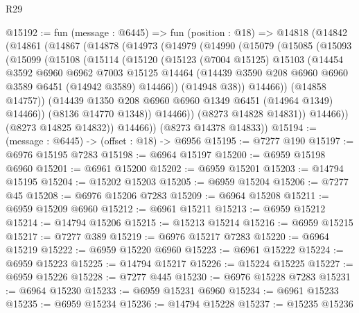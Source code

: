\begin{lexlean}{R29}
\begin{coremodule}
@15192 := fun (message : @6445) =>
  fun (position : @18) =>
  @14818
    (@14842
      (@14861
        (@14867
          (@14878
            (@14973
              (@14979
                (@14990
                  (@15079
                    (@15085
                      (@15093
                        (@15099
                          (@15108
                            (@15114
                              (@15120
                                (@15123
                                  (@7004 @15125)
                                  @15103
                                  (@14454
                                    @3592
                                    @6960
                                    @6962
                                    @7003
                                    @15125
                                    @14464
                                    (@14439
                                      @3590
                                      @208
                                      @6960
                                      @6960
                                      @3589
                                      @6451
                                      (@14942 @3589)
                                      @14466))
                                  (@14948 @38))
                                @14466))
                            (@14858 @14757))
                          (@14439 @1350 @208 @6960 @6960 @1349 @6451 (@14964 @1349) @14466))
                        (@8136 @14770 @1348))
                      @14466))
                  (@8273 @14828 @14831))
                @14466))
            (@8273 @14825 @14832))
          @14466))
      (@8273 @14378 @14833))
@15194 := (message : @6445) -> (offset : @18) -> @6956
@15195 := @7277 @190
@15197 := @6976 @15195 @7283
@15198 := @6964 @15197
@15200 := @6959 @15198 @6960
@15201 := @6961 @15200
@15202 := @6959 @15201
@15203 := @14794 @15195
@15204 := @15202 @15203
@15205 := @6959 @15204
@15206 := @7277 @45
@15208 := @6976 @15206 @7283
@15209 := @6964 @15208
@15211 := @6959 @15209 @6960
@15212 := @6961 @15211
@15213 := @6959 @15212
@15214 := @14794 @15206
@15215 := @15213 @15214
@15216 := @6959 @15215
@15217 := @7277 @389
@15219 := @6976 @15217 @7283
@15220 := @6964 @15219
@15222 := @6959 @15220 @6960
@15223 := @6961 @15222
@15224 := @6959 @15223
@15225 := @14794 @15217
@15226 := @15224 @15225
@15227 := @6959 @15226
@15228 := @7277 @445
@15230 := @6976 @15228 @7283
@15231 := @6964 @15230
@15233 := @6959 @15231 @6960
@15234 := @6961 @15233
@15235 := @6959 @15234
@15236 := @14794 @15228
@15237 := @15235 @15236

\end{coremodule}
\end{lexlean}
